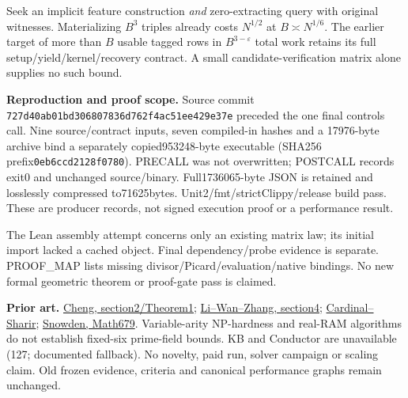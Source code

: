 \documentclass[10pt]{article}
\begin{document}
Seek an implicit feature construction \emph{and} zero-extracting query with
original witnesses. Materializing $B^3$ triples already costs $N^{1/2}$ at
$B\asymp N^{1/6}$. The earlier target of more than $B$ usable tagged rows in
$B^{3-\varepsilon}$ total work retains its full setup/yield/kernel/recovery
contract. A small candidate-verification matrix alone supplies no such bound.

\textbf{Reproduction and proof scope.} Source commit
\texttt{727d40ab01bd306807836d762f4ac51ee429e37e} preceded the one final
controls call. Nine source/contract inputs, seven compiled-in hashes and a
17976-byte archive bind a separately copied953248-byte executable (SHA256
prefix\texttt{0eb6ccd2128f0780}). PRECALL was not overwritten; POSTCALL records
exit0 and unchanged source/binary. Full1736065-byte JSON is retained and
losslessly compressed to71625bytes. Unit2/fmt/strictClippy/release build pass.
These are producer records, not signed execution proof or a performance result.

The Lean assembly attempt concerns only an existing matrix law; its initial
import lacked a cached object. Final dependency/probe evidence is separate.
PROOF\_MAP lists missing divisor/Picard/evaluation/native bindings. No new
formal geometric theorem or proof-gate pass is claimed.

\textbf{Prior art.} \href{https://arxiv.org/pdf/cs/0507026}{Cheng, section2/Theorem1};
\href{https://arxiv.org/pdf/1501.01138}{Li--Wan--Zhang, section4};
\href{https://drops.dagstuhl.de/entities/document/10.4230/LIPIcs.SoCG.2023.22}{Cardinal--Sharir};
\href{https://websites.umich.edu/asnowden/teaching/2013/679/L02.html}{Snowden, Math679}.
Variable-arity NP-hardness and real-RAM algorithms do not establish fixed-six
prime-field bounds. KB and Conductor are unavailable (127; documented fallback).
No novelty, paid run, solver campaign or scaling claim. Old frozen evidence,
criteria and canonical performance graphs remain unchanged.
\end{document}
